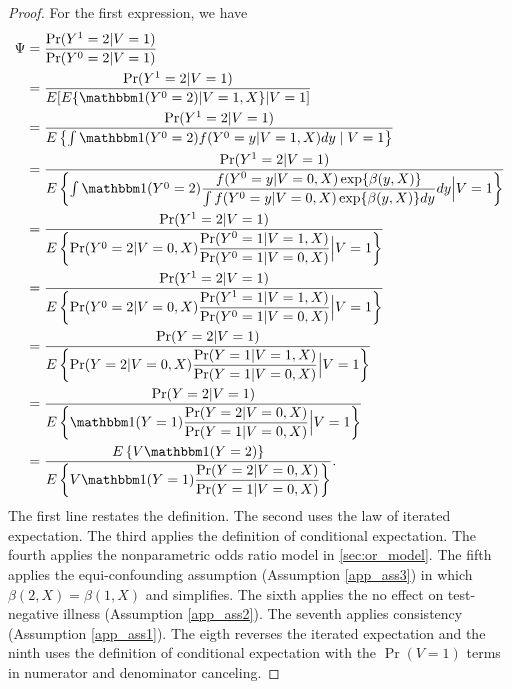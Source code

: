 \begin{appendix}
\begin{refsection}
\begin{proof}
    For the first expression, we have 
    \begin{align*}
        \Psi &= \dfrac{\Pr(Y^1=2|V=1)}{\Pr(Y^0=2|V=1)} \\
        &= \dfrac{\Pr(Y^1=2|V=1)}{E[E\{\mathbbm 1 (Y^0 = 2) | V = 1, X\} | V = 1]} \\
        &= \dfrac{\Pr(Y^1=2|V=1)}{E\left\{\int \mathbbm 1 (Y^0 = 2) f(Y^0 = y | V = 1, X) dy \mid  V = 1\right\}} \\
        &= \dfrac{\Pr(Y^1=2|V=1)}{E\left\{\int \mathbbm 1 (Y^0 = 2) \dfrac{f(Y^0 = y | V = 0, X) \exp\{\beta(y, X)\}}{\int f(Y^0 = y | V = 0, X) \exp\{\beta(y, X)\}dy}dy \Big|  V = 1\right\}} \\
        &= \dfrac{\Pr(Y^1=2|V=1)}{E\left\{ \Pr(Y^0 = 2 | V = 0, X) \dfrac{\Pr(Y^0 = 1 | V = 1, X)}{\Pr(Y^0 = 1 | V = 0, X)} \Big|  V = 1\right\}} \\
         &= \dfrac{\Pr(Y^1=2|V=1)}{E\left\{ \Pr(Y^0 = 2 | V = 0, X) \dfrac{\Pr(Y^1 = 1 | V = 1, X)}{\Pr(Y^0 = 1 | V = 0, X)} \Big| V = 1\right\}} \\
        &= \dfrac{\Pr(Y=2|V=1)}{E\left\{ \Pr(Y = 2 | V = 0, X) \dfrac{\Pr(Y = 1 | V = 1, X)}{\Pr(Y = 1 | V = 0, X)} \Big|  V = 1\right\}} \\
        &= \dfrac{\Pr(Y=2|V=1)}{E\left\{ \mathbbm 1(Y = 1) \dfrac{\Pr(Y = 2 | V = 0, X)}{\Pr(Y = 1 | V = 0, X)} \Big| V = 1\right\}} \\
        &= \dfrac{E\left\{V \mathbbm 1(Y = 2)\right\}}{E\left\{ V \mathbbm 1(Y=1) \dfrac{\Pr(Y = 2 | V = 0, X) }{\Pr(Y = 1 | V = 0, X)}  \right\}}.
    \end{align*}
    The first line restates the definition. The second uses the law of iterated expectation. The third applies the definition of conditional expectation. The fourth applies the nonparametric odds ratio model in \ref{sec:or_model}. The fifth applies the equi-confounding assumption (Assumption \ref{app_ass3}) in which $\beta(2,X) = \beta(1,X)$ and simplifies. The sixth applies the no effect on test-negative illness (Assumption \ref{app_ass2}). The seventh applies consistency (Assumption \ref{app_ass1}). The eigth reverses the iterated expectation and the ninth uses the definition of conditional expectation with the $\Pr(V=1)$ terms in numerator and denominator canceling.
    

\end{proof}
\end{refsection}
\end{appendix}
